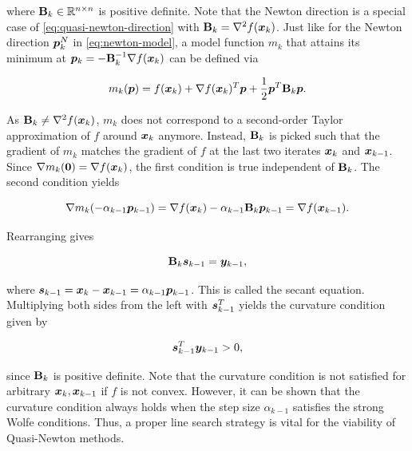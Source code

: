 \noindent where $\mathbf{B}_k \in \mathbb{R}^{n \times n}$ is positive definite. Note that the Newton direction is a special 
case of 
\autoref{eq:quasi-newton-direction} with $\mathbf{B}_k = \nabla^2 f(\bm{x}_k)$. Just like for the Newton direction $\bm{p}^N_k$ in
\autoref{eq:newton-model}, a model function $m_k$ 
that attains its minimum at $\bm{p}_k  = -\mathbf{B}^{-1}_k \nabla f(\bm{x}_k)$ can be defined via

\begin{equation}\label{eq:quasi-newton-model}
    m_k(\bm{p}) = f(\bm{x}_k)  + \nabla f(\bm{x}_k)^T \bm{p} + \frac{1}{2} \bm{p}^T\mathbf{B}_k\bm{p}.
\end{equation}

\noindent As $\mathbf{B}_k \neq \nabla^2 f(\bm{x}_k)$, $m_k$ does not correspond to a second-order Taylor approximation of $f$ around 
$\bm{x}_k$ anymore. Instead, $\mathbf{B}_k$ is picked such that the gradient of $m_k$ matches the gradient of $f$ at the last two iterates 
$\bm{x}_k$ and $\bm{x}_{k-1}$.
Since $\nabla m_{k}(\bm{0}) = \nabla f(\bm{x}_k)$, the first condition is true independent of $\mathbf{B}_k$. The 
second condition yields

\[
    \nabla m_{k}(-\alpha_{k-1}\bm{p}_{k-1}) = \nabla f(\bm{x}_k) - \alpha_{k-1}\mathbf{B}_{k}\bm{p}_{k-1} = \nabla f(\bm{x}_{k-1}).
\]

\noindent Rearranging gives

\begin{equation}\label{eq:secant-equation}
    \mathbf{B}_k \bm{s}_{k-1} = \bm{y}_{k-1},
\end{equation}

\noindent where $\bm{s}_{k-1} = \bm{x}_k - \bm{x}_{k-1} = \alpha_{k-1}\bm{p}_{k-1}$. This is called the secant equation. 
Multiplying both sides from the left with $\bm{s}_{k-1}^T$ yields the curvature condition given by

\begin{equation}\label{eq:curvature-condition}
    \bm{s}_{k-1}^T \bm{y}_{k-1} > 0,
\end{equation}

\noindent since $\mathbf{B}_k$ is positive definite. Note that the curvature condition is not satisfied for arbitrary $\bm{x}_k, \bm{x}_{k-1}$ 
if $f$ is 
not convex. However, it can be shown that the curvature condition always holds when the step size $\alpha_{k-1}$ satisfies the strong Wolfe 
conditions. Thus, a proper line search strategy is vital for the viability of Quasi-Newton methods.

